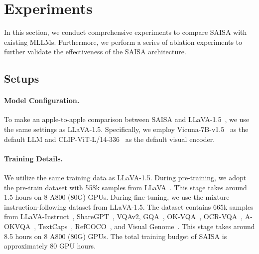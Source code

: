\section{Experiments}
In this section, we conduct comprehensive experiments to compare SAISA with existing MLLMs.
Furthermore, we perform a series of ablation experiments to further validate the effectiveness of the SAISA architecture.

\subsection{Setups}
\paragraph{Model Configuration.}
To make an apple-to-apple comparison between SAISA and LLaVA-1.5~\cite{liu2024improvedbaselinesvisualinstruction}, we use the same settings as LLaVA-1.5.
Specifically, we employ Vicuna-7B-v1.5~\cite{vicuna} as the default LLM and CLIP-ViT-L/14-336~\cite{radford2021learningtransferablevisualmodels} as the default visual encoder.

\vspace{-0.35cm}
\paragraph{Training Details.}
We utilize the same training data as LLaVA-1.5.
During pre-training, we adopt the pre-train dataset with 558k samples from LLaVA~\cite{liu2023visualinstructiontuning}. This stage takes around 1.5 hours on 8 A800 (80G) GPUs. 
During fine-tuning, we use the mixture instruction-following dataset from LLaVA-1.5. The dataset contains 665k samples from LLaVA-Instruct~\cite{liu2023visualinstructiontuning}, ShareGPT~\cite{sharegpt2023}, VQAv2, GQA~\cite{hudson2019gqanewdatasetrealworld}, OK-VQA~\cite{marino2019okvqavisualquestionanswering}, OCR-VQA~\cite{mishra2019ocrvqa}, A-OKVQA~\cite{schwenk2022aokvqabenchmarkvisualquestion}, TextCaps~\cite{sidorov2020textcapsdatasetimagecaptioning}, RefCOCO~\cite{kazemzadeh2014referitgame, mao2016generationcomprehensionunambiguousobject}, and Visual Genome~\cite{krishna2016visualgenomeconnectinglanguage}.
This stage takes around 8.5 hours on 8 A800 (80G) GPUs.
The total training budget  of SAISA is approximately 80 GPU hours.






